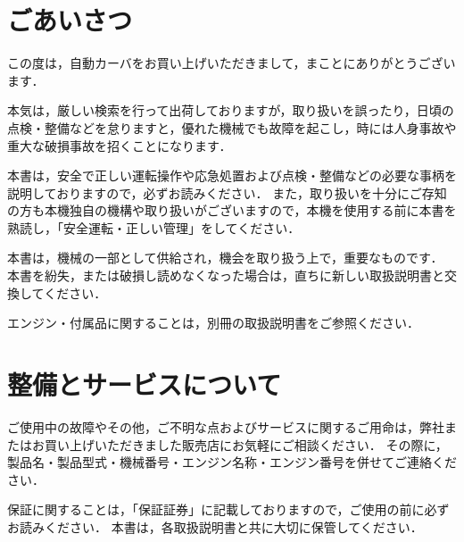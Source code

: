 %
%


\section*{ごあいさつ}

この度は，自動カーバをお買い上げいただきまして，まことにありがとうございます．

本気は，厳しい検索を行って出荷しておりますが，取り扱いを誤ったり，日頃の点検・整備などを怠りますと，優れた機械でも故障を起こし，時には人身事故や重大な破損事故を招くことになります．

本書は，安全で正しい運転操作や応急処置および点検・整備などの必要な事柄を説明しておりますので，必ずお読みください．
また，取り扱いを十分にご存知の方も本機独自の機構や取り扱いがございますので，本機を使用する前に本書を熟読し，「安全運転・正しい管理」をしてください．

本書は，機械の一部として供給され，機会を取り扱う上で，重要なものです．
本書を紛失，または破損し読めなくなった場合は，直ちに新しい取扱説明書と交換してください．

エンジン・付属品に関することは，別冊の取扱説明書をご参照ください．




\section*{整備とサービスについて}
ご使用中の故障やその他，ご不明な点およびサービスに関するご用命は，弊社またはお買い上げいただきました販売店にお気軽にご相談ください．
その際に，製品名・製品型式・機械番号・エンジン名称・エンジン番号を併せてご連絡ください．

保証に関することは，「保証証券」に記載しておりますので，ご使用の前に必ずお読みください．
本書は，各取扱説明書と共に大切に保管してください．
